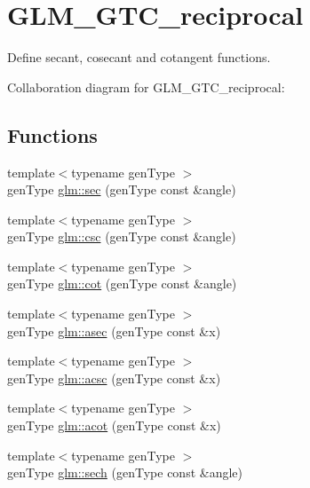 \hypertarget{group__gtc__reciprocal}{}\section{G\+L\+M\+\_\+\+G\+T\+C\+\_\+reciprocal}
\label{group__gtc__reciprocal}


Define secant, cosecant and cotangent functions.  


Collaboration diagram for G\+L\+M\+\_\+\+G\+T\+C\+\_\+reciprocal\+:
\subsection*{Functions}
\begin{DoxyCompactItemize}
\item 
{\footnotesize template$<$typename gen\+Type $>$ }\\gen\+Type \hyperlink{group__gtc__reciprocal_gab95b8f3c8aff3fbf2a50881a5977dd0d}{glm\+::sec} (gen\+Type const \&angle)
\item 
{\footnotesize template$<$typename gen\+Type $>$ }\\gen\+Type \hyperlink{group__gtc__reciprocal_ga3fc2ddd96679f1c3457561f1febd6051}{glm\+::csc} (gen\+Type const \&angle)
\item 
{\footnotesize template$<$typename gen\+Type $>$ }\\gen\+Type \hyperlink{group__gtc__reciprocal_gac336f426a9db332c8d8d697d2b401a3c}{glm\+::cot} (gen\+Type const \&angle)
\item 
{\footnotesize template$<$typename gen\+Type $>$ }\\gen\+Type \hyperlink{group__gtc__reciprocal_ga8bc6073587eccc1e5951250f25d78ef6}{glm\+::asec} (gen\+Type const \&x)
\item 
{\footnotesize template$<$typename gen\+Type $>$ }\\gen\+Type \hyperlink{group__gtc__reciprocal_ga8c4a4156fcd45b6fca189ac77c963ffd}{glm\+::acsc} (gen\+Type const \&x)
\item 
{\footnotesize template$<$typename gen\+Type $>$ }\\gen\+Type \hyperlink{group__gtc__reciprocal_ga134eae20165da173c3765b141eb2100a}{glm\+::acot} (gen\+Type const \&x)
\item 
{\footnotesize template$<$typename gen\+Type $>$ }\\gen\+Type \hyperlink{group__gtc__reciprocal_ga9c16b922edc8b0a2fdffa2a70b1ebe3f}{glm\+::sech} (gen\+Type const \&angle)

\end{DoxyCompactItemize}
